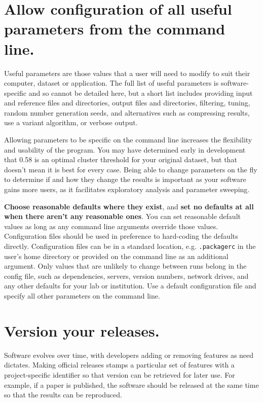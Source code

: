 \documentclass[10pt,letterpaper]{article}
\begin{document}
\section{Allow configuration of all useful parameters from the command line.}

Useful parameters are those values that a user will need to modify to suit
their computer, dataset or application. 
The full list of useful parameters is software-specific and so cannot be
detailed here, but a short list includes providing
input and reference files and directories,
output files and directories,
filtering,
tuning,
random number generation seeds,
and
alternatives such as compressing results,
use a variant algorithm,
or verbose output.

Allowing parameters to be specific on the
command line increases the flexibility and usability of the program. You
may have determined early in development that 0.58 is an optimal cluster threshold for your
original dataset, but that doesn't mean it is best for every
case. Being able to change parameters on the fly to determine if and how
they change the results is important as your software gains more users,
as it facilitates exploratory analysis and parameter sweeping.

\textbf{Choose reasonable defaults where they exist},
and \textbf{set no defaults at all when there aren't any reasonable ones}.
You can set reasonable default values
as long as any command line arguments
override those values. Configuration files should be used in preference
to hard-coding the defaults directly. Configuration files can be in a standard
location, e.g. \texttt{.packagerc} in the user's home directory or
provided on the command line as an additional argument.
Only values that are unlikely to
change between runs belong in the config file, such as dependencies,
servers, version numbers, network drives, and any other defaults for
your lab or institution. 
Use a default configuration file and specify all other parameters on the
command line.

\section{Version your releases.}

Software evolves over time, with developers adding or removing features as need
dictates. Making official releases stamps a particular set of features with a
project-specific identifier so that version can be retrieved for later use. For
example, if a paper is published, the software should be released at the same
time so that the results can be reproduced. 
\end{document}
